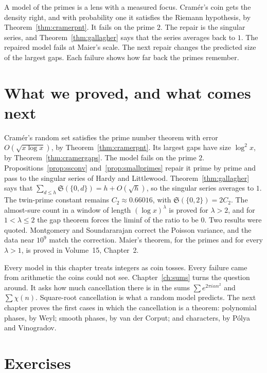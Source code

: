 \begin{beauty}
A model of the primes is a lens with a measured focus. Cramér's coin gets the density right, and with probability one it satisfies the Riemann hypothesis, by Theorem~\ref{thm:cramerpnt}. It fails on the prime $2$. The repair is the singular series, and Theorem~\ref{thm:gallagher} says that the series averages back to $1$. The repaired model fails at Maier's scale. The next repair changes the predicted size of the largest gaps. Each failure shows how far back the primes remember.
\end{beauty}

\section{What we proved, and what comes next}

Cramér's random set satisfies the prime number theorem with error $O(\sqrt{x\log x})$, by Theorem~\ref{thm:cramerpnt}. Its largest gaps have size $\log^2 x$, by Theorem~\ref{thm:cramergaps}. The model fails on the prime $2$. Propositions~\ref{prop:ssconv} and~\ref{prop:smallprimes} repair it prime by prime and pass to the singular series of Hardy and Littlewood. Theorem~\ref{thm:gallagher} says that $\sum_{d\le h}\mathfrak S(\{0,d\})=h+O(\sqrt h)$, so the singular series averages to $1$. The twin-prime constant remains $C_2\approx0.66016$, with $\mathfrak S(\{0,2\})=2C_2$. The almost-sure count in a window of length $(\log x)^\lambda$ is proved for $\lambda>2$, and for $1<\lambda\le 2$ the gap theorem forces the liminf of the ratio to be $0$. Two results were quoted. Montgomery and Soundararajan correct the Poisson variance, and the data near $10^9$ match the correction. Maier's theorem, for the primes and for every $\lambda>1$, is proved in Volume~15, Chapter~2.

Every model in this chapter treats integers as coin tosses. Every failure came from arithmetic the coins could not see. Chapter~\ref{ch:sums} turns the question around. It asks how much cancellation there is in the sums $\sum e^{2\pi i\alpha n^2}$ and $\sum\chi(n)$. Square-root cancellation is what a random model predicts. The next chapter proves the first cases in which the cancellation is a theorem: polynomial phases, by Weyl; smooth phases, by van der Corput; and characters, by P\'olya and Vinogradov.

\section{Exercises}

